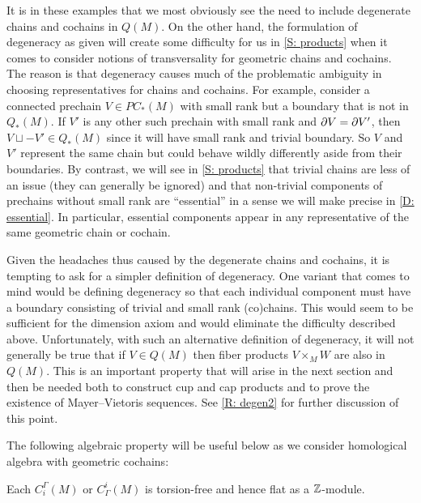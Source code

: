 \begin{remark}\label{R: degen1}
	It is in these examples that we most obviously see the need to include degenerate chains and cochains in $Q(M)$.
	On the other hand, the formulation of degeneracy as given will create some difficulty for us in \cref{S: products} when it comes to consider notions of transversality for geometric chains and cochains.
	The reason is that degeneracy causes much of the problematic ambiguity in choosing representatives for chains and cochains.
	For example, consider a connected prechain $V \in PC_*(M)$ with small rank but a boundary that is not in $Q_*(M)$.
	If $V'$ is any other such prechain with small rank and $\partial V = \partial V'$, then $V \sqcup -V' \in Q_*(M)$ since it will have small rank and trivial boundary.
	So $V$ and $V'$ represent the same chain but could behave wildly differently aside from their boundaries.
	By contrast, we will see in \cref{S: products} that trivial chains are less of an issue (they can generally be ignored) and that non-trivial components of prechains without small rank are ``essential'' in a sense we will make precise in \cref{D: essential}.
	In particular, essential components appear in any representative of the same geometric chain or cochain.

	Given the headaches thus caused by the degenerate chains and cochains, it is tempting to ask for a simpler definition of degeneracy.
	One variant that comes to mind would be defining degeneracy so that each individual component must have a boundary consisting of trivial and small rank (co)chains.
	This would seem to be sufficient for the dimension axiom and would eliminate the difficulty described above.
	Unfortunately, with such an alternative definition of degeneracy, it will not generally be true that if $V \in Q(M)$ then fiber products $V \times_M W$ are also in $Q(M)$.
	This is an important property that will arise in the next section and then be needed both to construct cup and cap products and to prove the existence of Mayer--Vietoris sequences.
	See \cref{R: degen2} for further discussion of this point.
\end{remark}

The following algebraic property will be useful below as we consider homological algebra with geometric cochains:

\begin{lemma}
	Each $C_i^\Gamma(M)$ or $C_\Gamma^i(M)$ is torsion-free and hence flat as a $\mathbb{Z}$-module.
\end{lemma}

